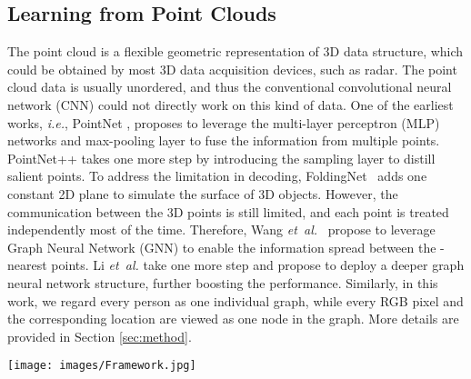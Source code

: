 \documentclass[journal]{IEEEtran}
\def\ie{\emph{i.e.}}
\def\etal{\emph{et~al.}}
\begin{document}
\subsection{Learning from Point Clouds} 
The point cloud is a flexible geometric representation of 3D data structure, which could be obtained by most 3D data acquisition devices, such as radar. The point cloud data is usually unordered, and thus the conventional convolutional neural network (CNN) could not directly work on this kind of data. One of the earliest works, \ie, PointNet \cite{qi2017pointnet}, proposes to leverage the multi-layer perceptron (MLP) networks and max-pooling layer to fuse the information from multiple points. PointNet++ \cite{qi2017pointnet++} takes one more step by introducing the sampling layer to distill salient points. To address the limitation in decoding, FoldingNet~\cite{yang2018foldingnet} adds one constant 2D plane to simulate the surface of 3D objects. However, the communication between the 3D points is still limited, and each point is treated independently most of the time. Therefore, Wang \etal~\cite{wang2019dynamic} propose to leverage Graph Neural Network (GNN) \cite{scarselli2008graph} to enable the information spread between the -nearest points. Li \etal \cite{li2019deepgcns} take one more step and propose to deploy a deeper graph neural network structure, further boosting the performance.
Similarly, in this work, we regard every person as one individual graph, while every RGB pixel and the corresponding location are viewed as one node in the graph. More details are provided in Section \ref{sec:method}.   

\begin{figure*}[t]
\begin{center}
     \texttt{[image: images/Framework.jpg]}
\end{center} \caption{ \textbf{OG-Net Architecture}. OG-Net is simply built via stacking Omni-scale Modules.  denotes the feature of  points with -dim attribute. Given the point cloud of , we split the geometry location  and the rgb color data . The 3D location information, \ie, (x,y,z), is to build the KNN graph, while the rgb data is to extract the appearance feature as the conventional 2D CNNs. We progressively downsample the number of selected points , while increasing the appearance feature length . For the last KNN Graph, we concatenate the position  and the appearance feature  to yield a non-local attention (see the red dash arrow). Finally, we concatenate the outputs of average pooling and max pooling layer, followed by one fully connected (FC) layer and one batch normalization (BN) layer. We adopt the conventional pretext task, \ie, identity classification , as the optimization objective to learn the pedestrian representation. When testing, we drop the last classifier and extract the compressed feature of  dimensions as the pedestrian representation for matching. }
      \label{fig:Framework}
\end{figure*}
\end{document}

